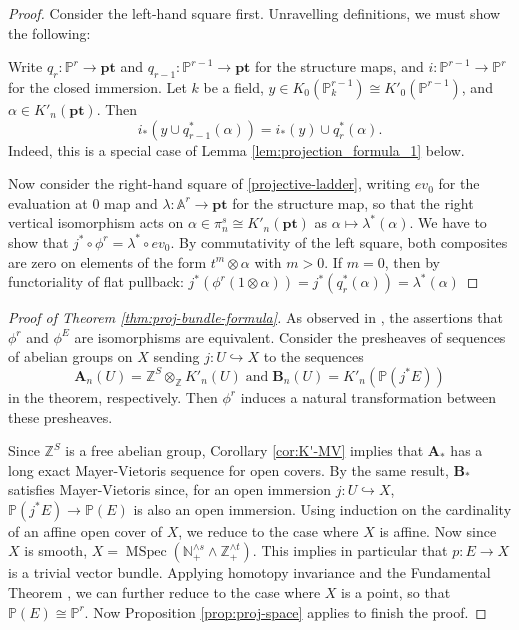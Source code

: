 \documentclass[12pt]{amsart}
\newcommand{\A}{\mathbb{A}}
\newcommand{\Z}{\mathbb{Z}}
\newcommand{\N}{\mathbb{N}}
\newcommand{\bbP}{\mathbb{P}}
\newcommand{\pt}{\mathbf{pt}}
\def\MSpec{\operatorname{MSpec}}
\numberwithin{equation}{section}
\theoremstyle{plain}
\theoremstyle{definition}
\theoremstyle{remark}
\begin{document}
\begin{proof}
	Consider the left-hand square first. Unravelling definitions, we must show the following:
	
	 Write $q_r:\bbP^r\to \pt$ and $q_{r-1}: \bbP^{r-1}\to \pt$ for the structure maps, and $i:\bbP^{r-1}\to\bbP^r$ for the closed immersion. Let $k$ be a field, $y\in K_0(\bbP^{r-1}_k)\cong K'_0(\bbP^{r-1})$, and $\alpha\in K'_n(\pt)$. Then
	\[ i_*(y\cup q_{r-1}^*(\alpha)) = i_*(y)\cup q_r^*(\alpha). \]
	Indeed, this is a special case of Lemma \ref{lem:projection_formula_1} below. 
	
	Now consider the right-hand square of \eqref{projective-ladder}, writing $ev_0$ for the evaluation at $0$ map and $\lambda:\A^r\to \pt$ for the structure map, so that the right vertical isomorphism acts on $\alpha\in\pi^s_n\cong K'_n(\pt)$ as $\alpha\mapsto \lambda^*(\alpha)$. We have to show that $j^*\circ\phi^r = \lambda^*\circ ev_0$. By commutativity of the left square, both composites are zero on elements of the form $t^m\otimes\alpha$ with $m > 0$. If $m = 0$, then by functoriality of flat pullback:
	$j^*(\phi^r(1\otimes\alpha))  = j^* (q_r^*(\alpha)) = \lambda^*(\alpha)$
\end{proof}

\begin{proof}[Proof of Theorem \ref{thm:proj-bundle-formula}]
	As observed in \cite[4.3]{Quillen}, the assertions that $\phi^r$ and $\phi^E$ are isomorphisms are equivalent. Consider the presheaves of sequences of abelian groups on $X$ sending $j:U\hookrightarrow X$ to the sequences 
	\[\mathbf{A}_n(U) = \Z^{S}\otimes_\Z K'_n(U)\; \text{and}\; 
	\mathbf{B}_n(U) = K'_n(\bbP(j^* E))\]
	 in the theorem, respectively. Then $\phi^r$ induces a natural transformation between these presheaves. 
	
	Since $\Z^{S}$ is a free abelian group, Corollary \ref{cor:K'-MV} implies that $\mathbf{A}_*$ has a long exact Mayer-Vietoris sequence for open covers. By the same result, $\mathbf{B}_*$ satisfies Mayer-Vietoris since, for an open immersion $j:U\hookrightarrow X$, $\bbP(j^* E)\to \bbP(E)$ is also an open immersion. Using induction on the cardinality of an affine open cover of $X$, we reduce to the case where $X$ is affine. Now since $X$ is smooth, 
	$X = \MSpec(\N_+^{\wedge s}\wedge \Z_+^{\wedge t})$. This implies in particular that $p:E\to X$ is a trivial vector bundle. Applying homotopy invariance and the Fundamental Theorem \cite[Theorem 4.6]{HW}, we can further reduce to the case where $X$ is a point, so that $\bbP(E) \cong \bbP^{r}$. Now Proposition \ref{prop:proj-space} applies to finish the proof. \end{proof}
\end{document}
